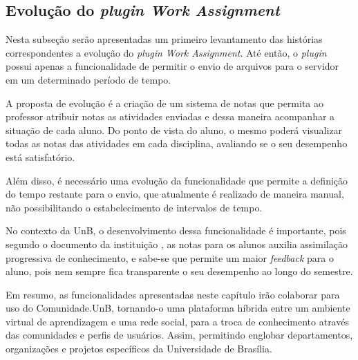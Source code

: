 \subsection{Evolução do \textit{plugin Work Assignment}}

Nesta subseção serão apresentadas um primeiro levantamento das histórias correspondentes a evolução do \textit{plugin Work Assignment}. Até então, o \textit{plugin} possui apenas a funcionalidade de permitir o envio de arquivos para o servidor em um determinado período de tempo.

A proposta de evolução é a criação de um sistema de notas que permita ao professor atribuir notas as atividades enviadas e dessa maneira acompanhar a situação de cada aluno. Do ponto de vista do aluno, o mesmo poderá visualizar todas as notas das atividades em cada disciplina, avaliando se o seu desempenho está satisfatório.

Além disso, é necessário uma evolução da funcionalidade que permite a definição do tempo restante para o envio, que atualmente é realizado de maneira manual, não possibilitando o estabelecimento de intervalos de tempo.



No contexto da UnB, o desenvolvimento dessa funcionalidade é importante, pois segundo o documento da instituição , as notas para os alunos auxilia assimilação progressiva de conhecimento, e sabe-se que permite um maior \textit{feedback} para o aluno, pois nem sempre fica transparente o seu desempenho ao longo do semestre.

Em resumo, as funcionalidades apresentadas neste capítulo irão colaborar para uso do Comunidade.UnB, tornando-o uma plataforma híbrida entre um ambiente virtual de aprendizagem e uma rede social, para a troca de conhecimento através das comunidades e perfis de usuários. Assim, permitindo englobar departamentos, organizações e projetos específicos da Universidade de Brasília.